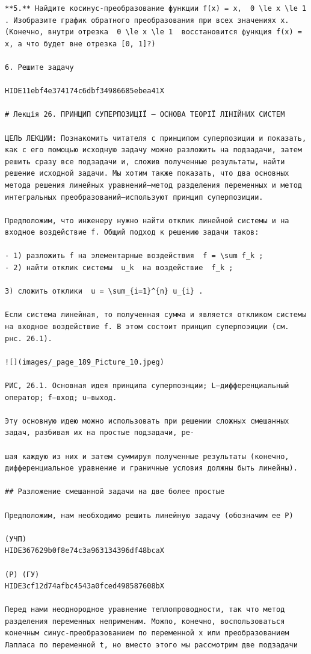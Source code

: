 \documentclass[
  ukrainian,
]{article}
\begin{document}
\begin{verbatim}
**5.** Найдите косинус-преобразование функции f(x) = x,  0 \le x \le 1 . Изобразите график обратного преобразования при всех значениях x. (Конечно, внутри отрезка  0 \le x \le 1  восстановится функция f(x) = x, а что будет вне отрезка [0, 1]?)

6. Решите задачу

HIDE11ebf4e374174c6dbf34986685ebea41X

# Лекція 26. ПРИНЦИП СУПЕРПОЗИЦІЇ — ОСНОВА ТЕОРІЇ ЛІНІЙНИХ СИСТЕМ

ЦЕЛЬ ЛЕКЦИИ: Познакомить читателя с принципом суперпозиции и показать, как с его помощью исходную задачу можно разложить на подзадачи, затем решить сразу все подзадачи и, сложив полученные результаты, найти решение исходной задачи. Мы хотим также показать, что два основных метода решения линейных уравнений—метод разделения переменных и метод интегральных преобразований—используют принцип суперпозиции.

Предположим, что инженеру нужно найти отклик линейной системы и на входное воздействие f. Общий подход к решению задачи таков:

- 1) разложить f на элементарные воздействия  f = \sum f_k ;
- 2) найти отклик системы  u_k  на воздействие  f_k ;

3) сложить отклики  u = \sum_{i=1}^{n} u_{i} .

Если система линейная, то полученная сумма и является откликом системы на входное воздействие f. В этом состоит принцип суперпоэиции (см. рнс. 26.1).

![](images/_page_189_Picture_10.jpeg)

РИС, 26.1. Основная идея принципа суперпоэнции; L—дифференциальный оператор; f—вход; u—выход.

Эту основную идею можно использовать при решении сложных смешанных задач, разбивая их на простые подзадачи, ре-

шая каждую из них и затем суммируя полученные результаты (конечно, дифференциальное уравнение и граничные условия должны быть линейны).

## Разложение смешанной задачи на две более простые

Предположим, нам необходимо решить линейную задачу (обозначим ее P)

(УЧП) 
HIDE367629b0f8e74c3a963134396df48bcaX

(Р) (ГУ) 
HIDE3cf12d74afbc4543a0fced498587608bX

Перед нами неоднородное уравнение теплопроводности, так что метод разделения переменных неприменим. Можпо, конечно, воспользоваться конечным синус-преобразованием по переменной x или преобразованием Лапласа по переменной t, но вместо этого мы рассмотрим две подзадачи


\end{verbatim}
\end{document}
